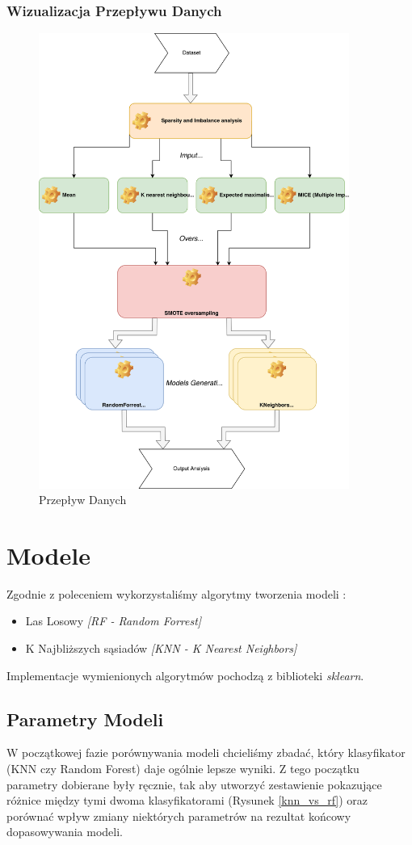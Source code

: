 \documentclass[11pt]{article}
\begin{document}
\subsubsection{Wizualizacja Przepływu Danych}
\begin{figure}[h]
	\caption{Przepływ Danych}
	\begin{center}
		\includegraphics[width=4in]{Dataflow}
	\end{center}
\end{figure}
\section{Modele}
Zgodnie z poleceniem wykorzystaliśmy algorytmy tworzenia modeli : 
\begin{itemize}
	\item Las Losowy \textit{[RF - Random Forrest]}
	\item K Najbliższych sąsiadów \textit{[KNN - K Nearest Neighbors]}
\end{itemize}
Implementacje wymienionych algorytmów pochodzą z biblioteki \textit{sklearn}.
\subsection{Parametry Modeli}
W początkowej fazie porównywania modeli chcieliśmy zbadać, który klasyfikator (KNN czy Random Forest) daje ogólnie lepsze wyniki. Z tego początku parametry dobierane były ręcznie, tak aby utworzyć zestawienie pokazujące różnice między tymi dwoma klasyfikatorami (Rysunek \ref{knn_vs_rf}) oraz porównać wpływ zmiany niektórych parametrów na rezultat końcowy dopasowywania modeli.
\end{document}
